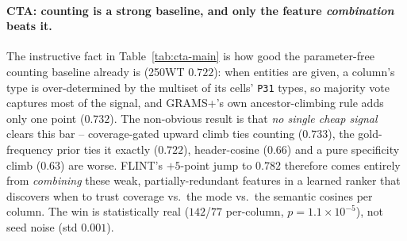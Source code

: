 \paragraph{CTA: counting is a strong baseline, and only the feature \emph{combination} beats it.}
The instructive fact in Table~\ref{tab:cta-main} is how good the parameter-free
counting baseline already is (250WT $0.722$): when entities are given, a column's type
is over-determined by the multiset of its cells' \texttt{P31} types, so majority vote
captures most of the signal, and GRAMS+'s own ancestor-climbing rule adds only one
point ($0.732$). The non-obvious result is that \emph{no single cheap signal}
clears this bar -- coverage-gated upward climb ties counting ($0.733$), the
gold-frequency prior ties it exactly ($0.722$), header-cosine ($0.66$) and a pure
specificity climb ($0.63$) are worse. FLINT's $+5$-point jump to $0.782$ therefore
comes entirely from \emph{combining} these weak, partially-redundant features in a
learned ranker that discovers when to trust coverage vs.\ the mode vs.\ the
semantic cosines per column. The win is statistically real ($142$/$77$ per-column,
$p{=}1.1\times10^{-5}$), not seed noise (std $0.001$).

